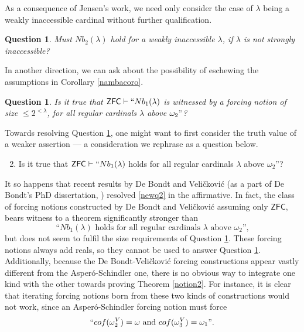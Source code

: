 \documentclass[12pt, twoside]{memoir}
\numberwithin{equation}{section}
\newtheorem{ques}[thm]{Question}
\theoremstyle{definition}
\theoremstyle{remark}
\theoremstyle{definition}
\theoremstyle{definition}
\theoremstyle{definition}
\theoremstyle{remark}
\begin{document}
As a consequence of Jensen's work, we need only consider the case of $\lambda$ being a weakly inaccessible cardinal without further qualification.

\begin{ques}\label{q428}
Must $Nb_2(\lambda)$ hold for a weakly inaccessible $\lambda$, if $\lambda$ is not strongly inaccessible?
\end{ques}

In another direction, we can ask about the possibility of eschewing the assumptions in Corollary \ref{nambacoro}.

\begin{ques}\label{inzfc}
Is it true that $\mathsf{ZFC} \vdash ``Nb_1(\lambda)$ is witnessed by a forcing notion of size $\leq 2^{<\lambda}$, for all regular cardinals $\lambda$ above $\omega_2"$?
\end{ques}

Towards resolving Question \ref{inzfc}, one might want to first consider the truth value of a weaker assertion --- a consideration we rephrase as a question below.

\begin{enumerate}[label=(Q\arabic*)]
    \setcounter{enumi}{1}
    \item\label{newq2} Is it true that $\mathsf{ZFC} \vdash ``Nb_1(\lambda)$ holds for all regular cardinals $\lambda$ above $\omega_2$''?
\end{enumerate}

It so happens that recent results by De Bondt and Veli\v{c}kovi\'{c} (as a part of De Bondt's PhD dissertation, \cite{bendb}) resolved \ref{newq2} in the affirmative. In fact, the class of forcing notions constructed by De Bondt and Veli\v{c}kovi\'{c} assuming only $\mathsf{ZFC}$, bears witness to a theorem significantly stronger than 
\begin{equation*}
    \text{``}Nb_1(\lambda) \text{ holds for all regular cardinals } \lambda \text{ above } \omega_2 \text{'',}
\end{equation*}
but does not seem to fulfil the size requirements of Question \ref{inzfc}. These forcing notions always add reals, so they cannot be used to answer Question \ref{q428}. Additionally, because the De Bondt-Veli\v{c}kovi\'{c} forcing constructions appear vastly different from the Asper\'{o}-Schindler one, there is no obvious way to integrate one kind with the other towards proving Theorem \ref{notion2}. For instance, it is clear that iterating forcing notions born from these two kinds of constructions would not work, since an Asper\'{o}-Schindler forcing notion must force 
\begin{equation*}
    ``cof(\omega_2^V) = \omega \text{ and } cof(\omega_3^V) = \omega_1" \text{.}
\end{equation*}
\end{document}
